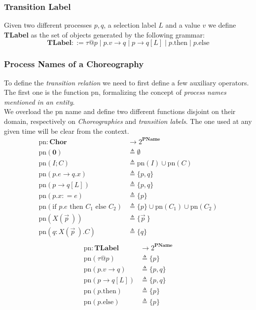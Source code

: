 \documentclass[12pt,a4paper,twoside]{book}
\makeatletter
\newcommand{\metaDef}{\mathrel{\mathop:}=}
\newcommand{\tlint}[1]{\tau@#1}
\newcommand{\tlthen}[1]{#1\text{.then}}
\newcommand{\tlelse}[1]{#1\text{.else}}
\newcommand{\gencom}{p.e \rightarrow q.x}
\newcommand{\gensel}{p \rightarrow q[L]}
\newcommand{\pn}{\mathrm{pn}}
\makeatother
\begin{document}
\subsubsection{Transition Label}
Given two different processes $p, q$, a selection label $L$ and a value $v$ we define \textbf{TLabel} as the set of objects generated by the following grammar:
$$
\textbf{TLabel} ::= \tlint{p} \mid p.v \rightarrow q \mid \gensel \mid \tlthen{p} \mid \tlelse{p}
$$

\subsubsection{Process Names of a Choreography}
To define the \textit{transition relation} we need to first define a few auxiliary operators.\\
The first one is the function $\pn$, formalizing the concept of \textit{process names mentioned in an entity}.\\
We overload the $\pn$ name and define two different functions disjoint on their domain, respectively on \textit{Choreographies} and \textit{transition labels}.
The one used at any given time will be clear from the context.
\begin{align*}
	\pn : \textbf{Chor} &\longrightarrow 2^\textbf{PName}\\
	\pn(\boldsymbol{0}) &\triangleq \emptyset\\
    \pn(I; C) &\triangleq \pn(I) \cup \pn(C)\\
    \pn(\gencom) &\triangleq \{p, q\}\\
    \pn(\gensel) &\triangleq \{p, q\}\\
    \pn(p.x \metaDef e) &\triangleq \{p\}\\
	\pn(\text{if } p.e \text{ then } C_1 \text{ else } C_2) &\triangleq \{p\} \cup \pn(C_1) \cup \pn(C_2)\\
    \pn(X(\vec{p}~)) &\triangleq \{\vec{p}~\}\\
    \pn(q : X(\vec{p}~).C ) &\triangleq \{q\}\\
\end{align*}
\begin{align*}
	\pn : \textbf{TLabel} &\longrightarrow 2^\textbf{PName}\\
	\pn(\tlint{p}) &\triangleq \{ p \}\\
    \pn(p.v \rightarrow q) &\triangleq \{p , q\}\\
    \pn(\gensel) &\triangleq \{p , q\}\\
    \pn(\tlthen{p}) &\triangleq \{ p \}\\
    \pn(\tlelse{p}) &\triangleq \{ p \}\\
\end{align*}
\end{document}
